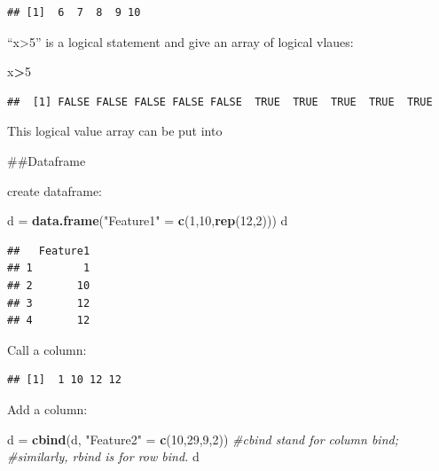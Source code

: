 \documentclass[]{article}
\newenvironment{Shaded}{\begin{snugshade}}{\end{snugshade}}
\newcommand{\CommentTok}[1]{\textcolor[rgb]{0.56,0.35,0.01}{\textit{#1}}}
\newcommand{\DecValTok}[1]{\textcolor[rgb]{0.00,0.00,0.81}{#1}}
\newcommand{\KeywordTok}[1]{\textcolor[rgb]{0.13,0.29,0.53}{\textbf{#1}}}
\newcommand{\NormalTok}[1]{#1}
\newcommand{\OperatorTok}[1]{\textcolor[rgb]{0.81,0.36,0.00}{\textbf{#1}}}
\newcommand{\StringTok}[1]{\textcolor[rgb]{0.31,0.60,0.02}{#1}}
\begin{document}
\begin{verbatim}
## [1]  6  7  8  9 10
\end{verbatim}

``x\textgreater{}5'' is a logical statement and give an array of logical
vlaues:

\begin{Shaded}
\begin{Highlighting}[]
\NormalTok{x}\OperatorTok{>}\DecValTok{5}
\end{Highlighting}
\end{Shaded}

\begin{verbatim}
##  [1] FALSE FALSE FALSE FALSE FALSE  TRUE  TRUE  TRUE  TRUE  TRUE
\end{verbatim}

This logical value array can be put into

\#\#Dataframe

create dataframe:

\begin{Shaded}
\begin{Highlighting}[]
\NormalTok{d =}\StringTok{ }\KeywordTok{data.frame}\NormalTok{(}\StringTok{"Feature1"}\NormalTok{ =}\StringTok{ }\KeywordTok{c}\NormalTok{(}\DecValTok{1}\NormalTok{,}\DecValTok{10}\NormalTok{,}\KeywordTok{rep}\NormalTok{(}\DecValTok{12}\NormalTok{,}\DecValTok{2}\NormalTok{)))}
\NormalTok{d}
\end{Highlighting}
\end{Shaded}

\begin{verbatim}
##   Feature1
## 1        1
## 2       10
## 3       12
## 4       12
\end{verbatim}

Call a column:

\begin{Shaded}
\end{Shaded}

\begin{verbatim}
## [1]  1 10 12 12
\end{verbatim}

Add a column:

\begin{Shaded}
\begin{Highlighting}[]
\NormalTok{d =}\StringTok{ }\KeywordTok{cbind}\NormalTok{(d, }\StringTok{"Feature2"}\NormalTok{ =}\StringTok{ }\KeywordTok{c}\NormalTok{(}\DecValTok{10}\NormalTok{,}\DecValTok{29}\NormalTok{,}\DecValTok{9}\NormalTok{,}\DecValTok{2}\NormalTok{)) }\CommentTok{#cbind stand for column bind;}
    \CommentTok{#similarly, rbind is for row bind. }
\NormalTok{d}
\end{Highlighting}
\end{Shaded}
\end{document}
